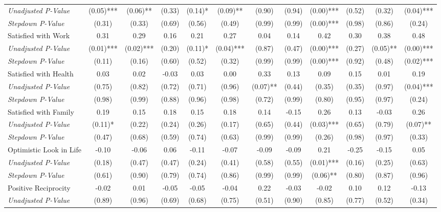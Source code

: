 \begin{tabular}{l c c c c c c c c c c c}
\quad \textit{Unadjusted P-Value} & (0.05)*** & (0.06)** & (0.33) & (0.14)* & (0.09)** & (0.90) & (0.94) & (0.00)*** & (0.52) & (0.32) & (0.04)*** \\
\quad \textit{Stepdown P-Value} & (0.31) & (0.33) & (0.69) & (0.56) & (0.49) & (0.99) & (0.99) & (0.00)*** & (0.98) & (0.86) & (0.24) \\
Satisfied with Work & 0.31 & 0.29 & 0.16 & 0.21 & 0.27 & 0.04 & 0.14 & 0.42 & 0.30 & 0.38 & 0.48 \\
\quad \textit{Unadjusted P-Value} & (0.01)*** & (0.02)*** & (0.20) & (0.11)* & (0.04)*** & (0.87) & (0.47) & (0.00)*** & (0.27) & (0.05)** & (0.00)*** \\
\quad \textit{Stepdown P-Value} & (0.11) & (0.16) & (0.60) & (0.52) & (0.32) & (0.99) & (0.99) & (0.00)*** & (0.92) & (0.48) & (0.02)*** \\
Satisfied with Health & 0.03 & 0.02 & -0.03 & 0.03 & 0.00 & 0.33 & 0.13 & 0.09 & 0.15 & 0.01 & 0.19 \\
\quad \textit{Unadjusted P-Value} & (0.75) & (0.82) & (0.72) & (0.71) & (0.96) & (0.07)** & (0.44) & (0.35) & (0.35) & (0.97) & (0.04)*** \\
\quad \textit{Stepdown P-Value} & (0.98) & (0.99) & (0.88) & (0.96) & (0.98) & (0.72) & (0.99) & (0.80) & (0.95) & (0.97) & (0.24) \\
Satisfied with Family & 0.19 & 0.15 & 0.18 & 0.15 & 0.18 & 0.14 & -0.15 & 0.26 & 0.13 & -0.03 & 0.26 \\
\quad \textit{Unadjusted P-Value} & (0.11)* & (0.22) & (0.24) & (0.26) & (0.17) & (0.65) & (0.44) & (0.03)*** & (0.65) & (0.79) & (0.07)** \\
\quad \textit{Stepdown P-Value} & (0.47) & (0.68) & (0.59) & (0.74) & (0.63) & (0.99) & (0.99) & (0.26) & (0.98) & (0.97) & (0.33) \\
Optimistic Look in Life & -0.10 & -0.06 & 0.06 & -0.11 & -0.07 & -0.09 & -0.09 & 0.21 & -0.25 & -0.15 & 0.05 \\
\quad \textit{Unadjusted P-Value} & (0.18) & (0.47) & (0.47) & (0.24) & (0.41) & (0.58) & (0.55) & (0.01)*** & (0.16) & (0.25) & (0.63) \\
\quad \textit{Stepdown P-Value} & (0.61) & (0.90) & (0.79) & (0.74) & (0.86) & (0.99) & (0.99) & (0.06)** & (0.80) & (0.87) & (0.96) \\
Positive Reciprocity & -0.02 & 0.01 & -0.05 & -0.05 & -0.04 & 0.22 & -0.03 & -0.02 & 0.10 & 0.12 & -0.13 \\
\quad \textit{Unadjusted P-Value} & (0.89) & (0.96) & (0.69) & (0.68) & (0.75) & (0.51) & (0.90) & (0.85) & (0.77) & (0.52) & (0.34) \\

\end{tabular}
